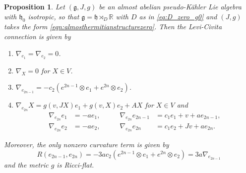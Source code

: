 \documentclass[10pt,a4paper]{amsart}
\newtheorem{proposition}{Proposition}
\newcommand{\R}{\mathbb{R}}
\newcommand{\frg}{\mathfrak{g}}
\newcommand{\frh}{\mathfrak{h}}
\newcommand{\g}{\lie g}
\newcommand{\h}{\lie h}
\newcommand{\lie}[1]{\mathfrak{#1}}
\begin{document}
\begin{proposition}\label{prop:curvature_isotropic_h0}
    Let $(\frg,J,g)$ be an almost abelian pseudo-Kähler Lie algebra with $\frh_0$ isotropic, so that $\g=\h\rtimes_D\R$ with $D$ as in \eqref{eq:D_zero_g0} and $(J,g)$ takes the form \eqref{eqn:almosthermitianstructurezero}. Then the Levi-Civita connection is given by \begin{enumerate}
        \item $\nabla_{e_1}=\nabla_{e_2}=0$.
        \item $\nabla_X=0$ for $X\in V$.
        \item $\nabla_{e_{2n-1}}=-c_2(e^{2n-1}\otimes e_1+e^{2n}\otimes e_2)$.
        \item $\nabla_{e_{2n}}X=g(v,JX)e_1+g(v,X)e_2+AX$ for $X\in V$ and $$\begin{aligned}
            \nabla_{e_{2n}}e_1&=-ae_1,\\
            \nabla_{e_{2n}}e_2&=-ae_2,
        \end{aligned}\qquad\begin{aligned}
            \nabla_{e_{2n}}e_{2n-1}&=c_1e_1+v+ae_{2n-1},\\
            \nabla_{e_{2n}}e_{2n}&=c_1e_2+Jv+ae_{2n}.
        \end{aligned}$$
    \end{enumerate}

    Moreover, the only nonzero curvature term is given by $$R(e_{2n-1},e_{2n})=-3ac_2(e^{2n-1}\otimes e_1+e^{2n}\otimes e_2)=3a\nabla_{e_{2n-1}}$$ and the metric $g$ is Ricci-flat.
\end{proposition}
\end{document}
